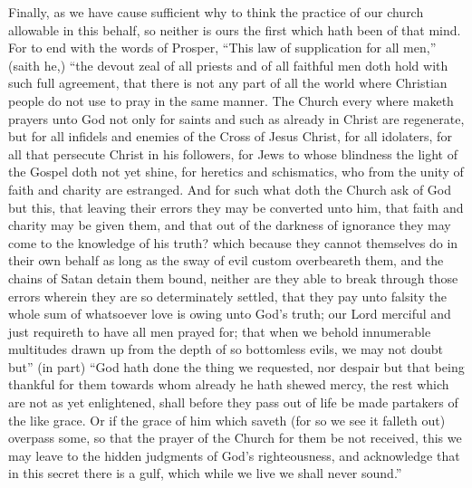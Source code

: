 Finally, as we have cause sufficient why to think the practice of our church allowable in this behalf, so neither is ours the first which hath been of that mind. For to end with the words of Prosper, “This law of supplication for all men,” (saith he,) “the devout zeal of all priests and of all faithful men doth hold with such full agreement, that there is not any part of all the world where Christian people do not use to pray in the same manner. The Church every where maketh prayers unto God not only for saints and such as  already in Christ are regenerate, but for all infidels and enemies of the Cross of Jesus Christ, for all idolaters, for all that persecute Christ in his followers, for Jews to whose blindness the light of the Gospel doth not yet shine, for heretics and schismatics, who from the unity of faith and charity are estranged. And for such what doth the Church ask of God but this, that leaving their errors they may be converted unto him, that faith and charity may be given them, and that out of the darkness of ignorance they may come to the knowledge of his truth? which because they cannot themselves do in their own behalf as long as the sway of evil custom overbeareth them, and the chains of Satan detain them bound, neither are they able to break through those errors wherein they are so determinately settled, that they pay unto falsity the whole sum of whatsoever love is owing unto God’s truth; our Lord merciful and just requireth to have all men prayed for; that when we behold innumerable multitudes drawn up from the depth of so bottomless evils, we may not doubt but” (in part) “God hath done the thing we requested, nor despair but that being thankful for them towards whom already he hath shewed mercy, the rest which are not as yet enlightened, shall before they pass out of life be made partakers of the like grace. Or if the grace of him which saveth (for so we see it falleth out) overpass some, so that the prayer of the Church for them be not received, this we may leave to the hidden judgments of God’s righteousness, and acknowledge that in this secret there is a gulf, which while we live we shall never sound.”

